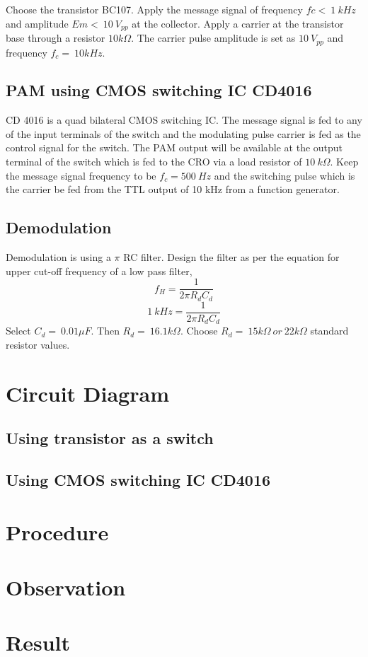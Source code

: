 \noindent Choose the transistor BC107.
\noindent Apply the message signal of frequency $fc < \ 1 \ kHz$ and amplitude $Em<\ 10\ V_{pp}$ at the collector.
\noindent Apply a carrier at the transistor base through a resistor $10 k\Omega$. The carrier pulse amplitude is set as $10 \ V_{pp}$ and frequency $f_c=\ 10 kHz$.

\subsection*{PAM using CMOS switching IC CD4016}
CD 4016 is a quad bilateral CMOS switching IC. The message signal is fed to any of the input terminals of the switch and the modulating pulse carrier is fed as the control signal for the switch. The PAM output will be available at the output terminal of the switch which is fed to the CRO via a load resistor of $10\ k\Omega$. Keep the message signal frequency to be $f_c=500 \ Hz$ and the switching pulse which is the carrier  be fed  from the TTL output of 10 kHz from a function generator.

\subsection*{Demodulation}
Demodulation is using a  $\pi$ RC filter.
\noindent Design the filter as per the equation for upper cut-off frequency of a low pass filter,
\begin{equation}
f_H=\frac{1}{2\pi R_dC_d}
\end{equation}
\begin{equation}
1\ kHz=\frac{1}{2\pi R_dC_d}
\end{equation}
\noindent Select $C_d=\ 0.01 \mu F$. Then $R_d=\ 16.1k\Omega$.
Choose $R_d=\ 15k\Omega \ or\ 22k\Omega$ standard resistor values.\\
\section*{Circuit Diagram}
\subsection*{Using transistor as a switch}
\subsection*{Using CMOS switching IC CD4016}

\section*{Procedure}
\section*{Observation}
\section*{Result}